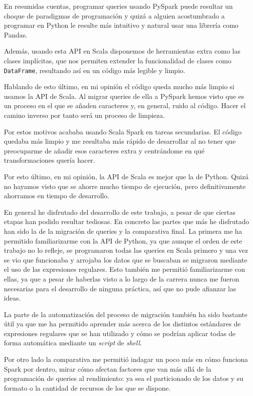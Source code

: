 \documentclass[12pt,twoside,titlepage]{report}
\begin{document}
En resumidas cuentas, programar queries usando PySpark puede resultar un choque de paradigmas de programación y quizá a alguien acostumbrado a programar en Python le resulte más intuitivo y natural usar una librería como Pandas.

Además, usando esta API en Scala disponemos de herramientas extra como las clases implícitas, que nos permiten extender la funcionalidad de clases como \texttt{DataFrame}, resultando así en un código más legible y limpio.

Hablando de esto último, en mi opinión el código queda mucho más limpio si usamos la API de Scala. Al migrar queries de ella a PySpark hemos visto que es un proceso en el que se añaden caracteres y, en general, ruido al código. Hacer el camino inverso por tanto será un proceso de limpieza.

Por estos motivos acababa usando Scala Spark en tareas secundarias. El código quedaba más limpio y me resultaba más rápido de desarrollar al no tener que preocuparme de añadir esos caracteres extra y centrándome en qué transformaciones quería hacer.

Por esto último, en mi opinión, la API de Scala es mejor que la de Python. Quizá no hayamos visto que se ahorre mucho tiempo de ejecución, pero definitivamente ahorramos en tiempo de desarrollo.

En general he disfrutado del desarrollo de este trabajo, a pesar de que ciertas etapas han podido resultar tediosas. En concreto las partes que más he disfrutado han sido la de la migración de queries y la comparativa final. La primera me ha permitido familiarizarme con la API de Python, ya que aunque el orden de este trabajo no lo refleje, se programaron todas las queries en Scala primero y una vez se vio que funcionaba y arrojaba los datos que se buscaban se migraron mediante el uso de las expresiones regulares. Esto también me permitió familiarizarme con ellas, ya que a pesar de haberlas visto a lo largo de la carrera nunca me fueron necesarias para el desarrollo de ninguna práctica, así que no pude afianzar las ideas.

La parte de la automatización del proceso de migración también ha sido bastante útil ya que me ha permitido aprender más acerca de los distintos estándares de expresiones regulares que se han utilizado y cómo se podrían aplicar todas de forma automática mediante un \textit{script} de \textit{shell}.

Por otro lado la comparativa me permitió indagar un poco más en cómo funciona Spark por dentro, mirar cómo afectan factores que van más allá de la programación de queries al rendimiento: ya sea el particionado de los datos y su formato o la cantidad de recursos de los que se dispone.
\end{document}
